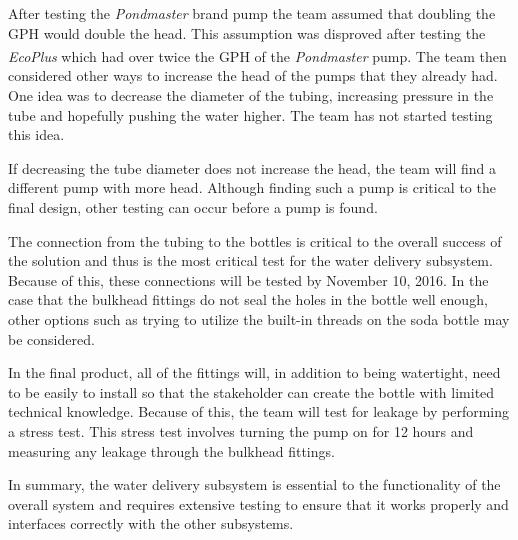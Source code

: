 \documentclass[12pt]{article}
\let\supscr=\textsuperscript
\begin{document}

After testing the \textit{Pondmaster} brand pump the team assumed that doubling the GPH would double
the head. This assumption was disproved after testing the \textit{EcoPlus\supscr{\textregistered}}
which had over twice the GPH of the \textit{Pondmaster} pump. The team then considered other ways to
increase the head of the pumps that they already had. One idea was to decrease the diameter of the
tubing, increasing pressure in the tube and hopefully pushing the water higher. The team has not
started testing this idea.

If decreasing the tube diameter does not increase the head, the team will find a different pump with
more head. Although finding such a pump is critical to the final design, other testing can occur
before a pump is found.

The connection from the tubing to the bottles is critical to the overall success of the solution and
thus is the most critical test for the water delivery subsystem. Because of this, these connections
will be tested by November 10, 2016. In the case that the bulkhead fittings do not seal the holes in
the bottle well enough, other options such as trying to utilize the built-in threads on the soda
bottle may be considered.

In the final product, all of the fittings will, in addition to being watertight, need to be easily
to install so that the stakeholder can create the bottle with limited technical knowledge. Because
of this, the team will test for leakage by performing a stress test. This stress test involves
turning the pump on for 12 hours and measuring any leakage through the bulkhead fittings.

In summary, the water delivery subsystem is essential to the functionality of the overall system and
requires extensive testing to ensure that it works properly and interfaces correctly with the other
subsystems.

\pagebreak
\end{document}
